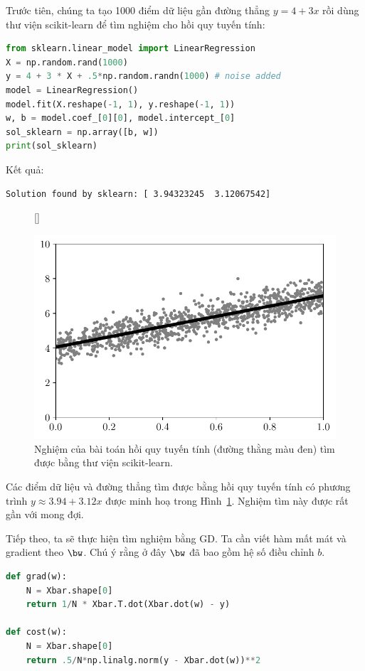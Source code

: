 Trước tiên, chúng ta tạo 1000 điểm dữ liệu gần đường thẳng $y = 4 + 3x$ rồi dùng thư viện scikit-learn để tìm nghiệm cho hồi quy tuyến tính:
  
\begin{lstlisting}[language=Python]
from sklearn.linear_model import LinearRegression 
X = np.random.rand(1000)
y = 4 + 3 * X + .5*np.random.randn(1000) # noise added
model = LinearRegression()
model.fit(X.reshape(-1, 1), y.reshape(-1, 1))
w, b = model.coef_[0][0], model.intercept_[0]
sol_sklearn = np.array([b, w])
print(sol_sklearn)
\end{lstlisting}
Kết quả:
\begin{lstlisting}
Solution found by sklearn: [ 3.94323245  3.12067542]
\end{lstlisting}
 
 
\begin{figure}[t]
     [\FBwidth]
     {\caption{ 
     Nghiệm của bài toán hồi quy tuyến tính (đường thằng màu đen) tìm được bằng
     thư viện scikit-learn.
     }
     \label{fig:7_lr_sklearn}}
     { %
    
     \includegraphics[width=.485\textwidth]{ebookML_src/src/grad_descent/LR_data.pdf}
     }
 \end{figure}
Các điểm dữ liệu và đường thẳng tìm được bằng hồi quy tuyến tính có phương trình
$y \approx 3.94 + 3.12x$ được minh hoạ trong Hình~\ref{fig:7_lr_sklearn}. Nghiệm
tìm này được rất gần với mong đợi.
 
Tiếp theo, ta sẽ thực hiện tìm nghiệm bằng GD. Ta cần viết hàm mất mát và gradient theo $\bw$. Chú ý rằng ở đây $\bw$ đã bao gồm hệ số điều chỉnh $b$.
 
\begin{lstlisting}[language=Python]
def grad(w):
    N = Xbar.shape[0]
    return 1/N * Xbar.T.dot(Xbar.dot(w) - y)

def cost(w):
    N = Xbar.shape[0]
    return .5/N*np.linalg.norm(y - Xbar.dot(w))**2
\end{lstlisting}


